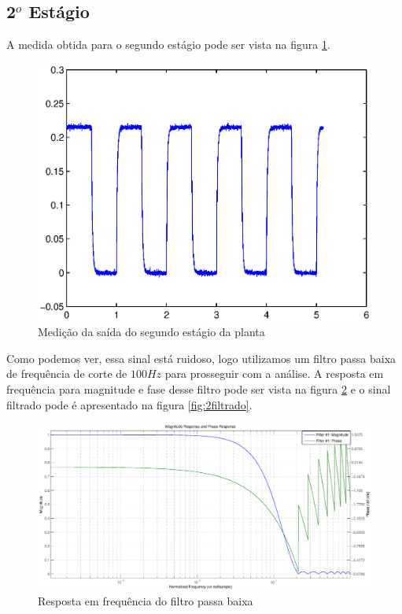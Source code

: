 \documentclass{article}
\begin{document}
\subsection{2$^o$ Estágio}
A medida obtida para o segundo estágio pode ser vista na figura \ref{fig:saida2}.
\begin{figure}[H]
	\centering
	\includegraphics[width=\linewidth]{saida2}
	\caption{Medição da saída do segundo estágio da planta}
	\label{fig:saida2}
\end{figure}
Como podemos ver, essa sinal está ruidoso, logo utilizamos um filtro passa baixa de frequência de corte de $100Hz$ para prosseguir com a análise. A resposta em frequência para magnitude e fase desse filtro pode ser vista na figura \ref{fig:filtro} e o sinal filtrado pode é apresentado na figura \ref{fig:2filtrado}.
\begin{figure}[H]
	\centering
	\includegraphics[width=\linewidth]{filtro}
	\caption{Resposta em frequência do filtro passa baixa}
	\label{fig:filtro}
\end{figure}
\end{document}
